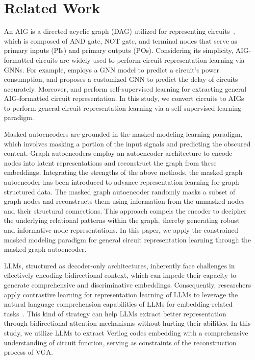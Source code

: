 \section{Related Work}
\label{sec:prelim}

An AIG is a directed acyclic graph (DAG) utilized for representing circuits~\citep{brummayer2006local}, which is composed of AND gate, NOT gate, and terminal nodes that serve as primary inputs (PIs) and primary outputs (POs). 
Considering its simplicity, AIG-formatted circuits are widely used to perform circuit representation learning via GNNs.
For example, \cite{zhang2020grannite} employs a GNN model to predict a circuit's power consumption, and \cite{zheng2024lstp} proposes a customized GNN to predict the delay of circuits accurately.
Moreover, \cite{wang2022functionality} and \cite{shi2023deepgate2} perform self-supervised learning for extracting general AIG-formatted circuit representation.
In this study, we convert circuits to AIGs to perform general circuit representation learning via a self-supervised learning paradigm.

Masked autoencoders \citep{he2022mae, bao2021beit} are grounded in the masked modeling learning paradigm, which involves masking a portion of the input signals and predicting the obscured content.
Graph autoencoders \citep{hou2023graphmae2, li2023maskgae} employ an autoencoder architecture to encode nodes into latent representations and reconstruct the graph from these embeddings. 
Integrating the strengths of the above methods, the masked graph autoencoder has been introduced to advance representation learning for graph-structured data. 
The masked graph autoencoder randomly masks a subset of graph nodes and reconstructs them using information from the unmasked nodes and their structural connections. 
This approach compels the encoder to decipher the underlying relational patterns within the graph, thereby generating robust and informative node representations. 
In this paper, we apply the constrained masked modeling paradigm for general circuit representation learning through the masked graph autoencoder.

LLMs, structured as decoder-only architectures, inherently face challenges in effectively encoding bidirectional context, which can impede their capacity to generate comprehensive and discriminative embeddings.
Consequently, researchers apply contrastive learning for representation learning of LLMs to leverage the natural language comprehension capabilities of LLMs for embedding-related tasks~\citep{muennighoff2024grl, behnamghader2024llm2vec, li2023gte,lee2024nvembed}. 
This kind of strategy can help LLMs extract better representation through bidirectional attention mechanisms without hurting their abilities.
In this study, we utilize LLMs to extract Verilog codes embedding with a comprehensive understanding of circuit function, serving as constraints of the reconstruction process of VGA.
